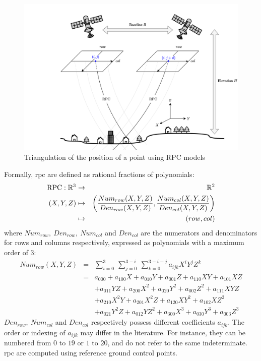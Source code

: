 \begin{figure}
    \centering
    \includegraphics[width=0.8\linewidth]{Images/Chap_1/RPC.png}
    \caption{Triangulation of the position of a point using RPC models}
    \label{fig:RPC}
\end{figure}

Formally, \acrshort{rpc} are defined as rational fractions of polynomials:  
\begin{eqnarray}
    \mathrm{RPC}:\mathbb{R}^3 &\rightarrow&\mathbb{R}^2\nonumber\\
    (X,Y,Z) 	&\mapsto& \left(\frac{Num_{row}(X,Y,Z)}{Den_{row}(X,Y,Z)}, \frac{Num_{col}(X,Y,Z)}{Den_{col}(X,Y,Z)}\right)\nonumber\\
    &\mapsto&(row,col)\label{eq:rpc}
\end{eqnarray}
where $Num_{row},~Den_{row},~Num_{col}$ and $Den_{col}$ are the numerators and denominators for rows and columns respectively, expressed as polynomials with a maximum order of $3$:
\begin{eqnarray*}
    Num_{row}(X,Y,Z) &=& \sum_{i=0}^3~\sum_{j=0}^{3-i}~\sum_{k=0}^{3-i-j}a_{ijk}X^iY^jZ^k\\
    &=& a_{000} + a_{100} X + a_{010} Y + a_{001} Z + a_{110} XY + a_{101} XZ \\
    &&+ a_{011} YZ + a_{200} X^2 + a_{020} Y^2 + a_{002} Z^2 + a_{111} XYZ \\
    && + a_{210} X^2Y + a_{201} X^2Z + a_{120} XY^2 + a_{102} XZ^2\\
    && + a_{021} Y^2Z + a_{012} YZ^2 + a_{300} X^3 + a_{030} Y^3 + a_{003} Z^3
\end{eqnarray*}
$Den_{row},~Num_{col}$ and $Den_{col}$ respectively possess different coefficients $a_{ijk}$. The order or indexing of $a_{ijk}$ may differ in the literature. For instance, they can be numbered from $0$ to $19$ or $1$ to $20$, and do not refer to the same indeterminate. \acrshort{rpc} are computed using reference ground control points.


